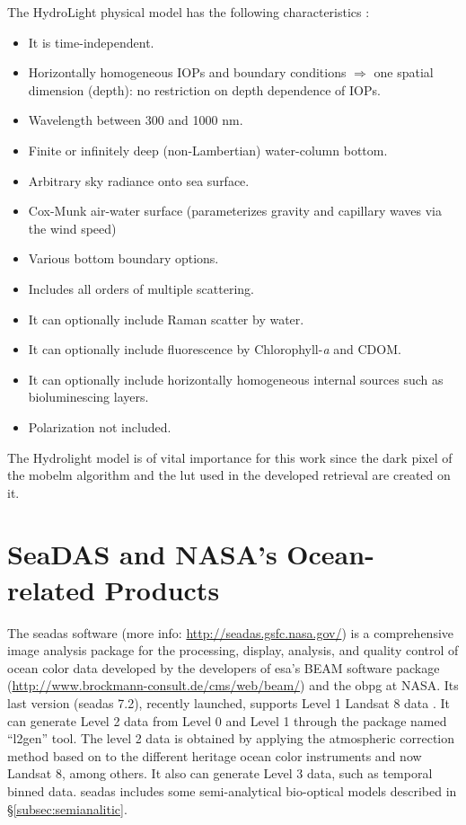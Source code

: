 The HydroLight physical model has the following characteristics \citep{MobleyHE}:

\begin{itemize}
	\item It is time-independent.
	\item Horizontally homogeneous IOPs and boundary conditions $\Rightarrow$ one spatial dimension (depth): no restriction on depth dependence of IOPs.
	\item Wavelength between 300 and 1000 nm.
	\item Finite or infinitely deep (non-Lambertian) water-column bottom.
	\item Arbitrary sky radiance onto sea surface.
	\item Cox-Munk air-water surface (parameterizes gravity and capillary waves via the wind speed)
	\item Various bottom boundary options.
	\item Includes all orders of multiple scattering.
	\item It can optionally include Raman scatter by water.
	\item It can optionally include fluorescence by Chlorophyll-{\it a} and CDOM.
	\item It can optionally include horizontally homogeneous internal sources such as bioluminescing layers.
	\item Polarization not included.
\end{itemize}

The Hydrolight model is of vital importance for this work since the dark pixel of the \gls{mobelm} algorithm and the \gls{lut} used in the developed retrieval are created on it.
\section{SeaDAS and NASA's Ocean-related Products}
\label{sec:seadas}

The \gls{seadas} software (more info: \url{http://seadas.gsfc.nasa.gov/}) is a comprehensive image analysis package for the processing, display, analysis, and quality control of ocean color data developed by the developers of \gls{esa}'s BEAM software package (\url{http://www.brockmann-consult.de/cms/web/beam/}) and the \gls{obpg} at NASA. Its last version (\gls{seadas} 7.2), recently launched, supports Level 1 Landsat 8 data \citep{Franz:2015}. It can generate Level 2 data from Level 0 and Level 1 through the package named ``l2gen'' tool. The level 2 data is obtained by applying the atmospheric correction method based on \citet{Gordon:1994} to the different heritage ocean color instruments and now Landsat 8, among others. It also can generate Level 3 data, such as temporal binned data. \gls{seadas} includes some  semi-analytical bio-optical models described in \S\ref{subsec:semianalitic}.

